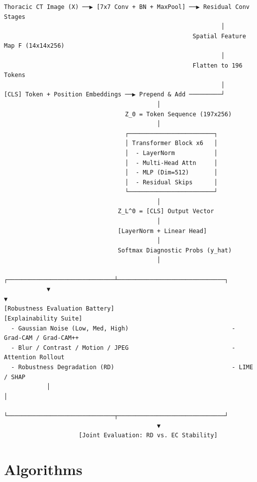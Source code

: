 \documentclass[conference]{IEEEtran}
\begin{document}
\begin{verbatim}
Thoracic CT Image (X) ──▶ [7x7 Conv + BN + MaxPool] ──▶ Residual Conv Stages
                                                             │
                                                     Spatial Feature Map F (14x14x256)
                                                             │
                                                     Flatten to 196 Tokens
                                                             │
[CLS] Token + Position Embeddings ──▶ Prepend & Add ─────────┘
                                           │
                                  Z_0 = Token Sequence (197x256)
                                           │
                                  ┌────────────────────────┐
                                  │ Transformer Block x6   │
                                  │  - LayerNorm           │
                                  │  - Multi-Head Attn     │
                                  │  - MLP (Dim=512)       │
                                  │  - Residual Skips      │
                                  └────────────────────────┘
                                           │
                                Z_L^0 = [CLS] Output Vector
                                           │
                                [LayerNorm + Linear Head]
                                           │
                                Softmax Diagnostic Probs (y_hat)
                                           │
            ┌──────────────────────────────┴──────────────────────────────┐
            ▼                                                             ▼
[Robustness Evaluation Battery]                               [Explainability Suite]
  - Gaussian Noise (Low, Med, High)                             - Grad-CAM / Grad-CAM++
  - Blur / Contrast / Motion / JPEG                             - Attention Rollout
  - Robustness Degradation (RD)                                 - LIME / SHAP
            │                                                             │
            └──────────────────────────────┬──────────────────────────────┘
                                           ▼
                     [Joint Evaluation: RD vs. EC Stability]
\end{verbatim}

\section{Algorithms}
\label{sec:algorithms}
\end{document}
